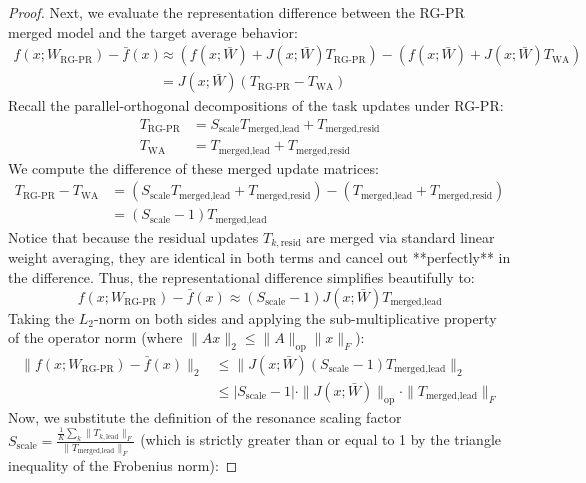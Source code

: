 \documentclass{article}
\theoremstyle{plain}
\theoremstyle{definition}
\theoremstyle{remark}
\begin{document}
\begin{proof}
Next, we evaluate the representation difference between the RG-PR merged model and the target average behavior:
\begin{align}
    f(x; W_{\text{RG-PR}}) - \bar{f}(x) &\approx \left( f(x; \bar{W}) + J(x; \bar{W}) T_{\text{RG-PR}} \right) - \left( f(x; \bar{W}) + J(x; \bar{W}) T_{\text{WA}} \right) \\
    &= J(x; \bar{W}) \left( T_{\text{RG-PR}} - T_{\text{WA}} \right)
\end{align}
Recall the parallel-orthogonal decompositions of the task updates under RG-PR:
\begin{align}
    T_{\text{RG-PR}} &= S_{\text{scale}} T_{\text{merged}, \text{lead}} + T_{\text{merged}, \text{resid}} \\
    T_{\text{WA}} &= T_{\text{merged}, \text{lead}} + T_{\text{merged}, \text{resid}}
\end{align}
We compute the difference of these merged update matrices:
\begin{align}
    T_{\text{RG-PR}} - T_{\text{WA}} &= \left( S_{\text{scale}} T_{\text{merged}, \text{lead}} + T_{\text{merged}, \text{resid}} \right) - \left( T_{\text{merged}, \text{lead}} + T_{\text{merged}, \text{resid}} \right) \\
    &= (S_{\text{scale}} - 1) T_{\text{merged}, \text{lead}}
\end{align}
Notice that because the residual updates $T_{k, \text{resid}}$ are merged via standard linear weight averaging, they are identical in both terms and cancel out **perfectly** in the difference. Thus, the representational difference simplifies beautifully to:
\begin{equation}
    f(x; W_{\text{RG-PR}}) - \bar{f}(x) \approx (S_{\text{scale}} - 1) J(x; \bar{W}) T_{\text{merged}, \text{lead}}
\end{equation}
Taking the $L_2$-norm on both sides and applying the sub-multiplicative property of the operator norm (where $\| A x \|_2 \le \| A \|_{\text{op}} \| x \|_F$):
\begin{align}
    \| f(x; W_{\text{RG-PR}}) - \bar{f}(x) \|_2 &\le \| J(x; \bar{W}) (S_{\text{scale}} - 1) T_{\text{merged}, \text{lead}} \|_2 \\
    &\le | S_{\text{scale}} - 1 | \cdot \| J(x; \bar{W}) \|_{\text{op}} \cdot \| T_{\text{merged}, \text{lead}} \|_F
\end{align}
Now, we substitute the definition of the resonance scaling factor $S_{\text{scale}} = \frac{\frac{1}{K} \sum_k \| T_{k, \text{lead}} \|_F}{\| T_{\text{merged}, \text{lead}} \|_F}$ (which is strictly greater than or equal to 1 by the triangle inequality of the Frobenius norm):

\end{proof}
\end{document}

